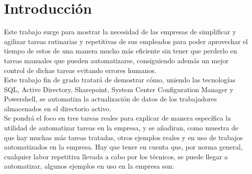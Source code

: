 \documentclass[a4paper, 12pt]{book}
\begin{document}
\tableofcontents 
\cleardoublepage
\listoffigures %



\cleardoublepage
\chapter{Introducción}
\label{sec:intro} %

Este trabajo surge para mostrar la necesidad de las empresas de simplificar y agilizar tareas rutinarias y repetitivas de sus empleados para poder aprovechar el tiempo de estos de una manera mucho más eficiente sin tener que perderlo en tareas manuales que pueden automatizarse, consiguiendo además un mejor control de dichas tareas evitando errores humanos.
\\

Este trabajo fin de grado tratará de demostrar cómo, uniendo las tecnologías SQL, Active Directory, Sharepoint, System Center Configuration Manager y Powershell, se automatiza la actualización de datos de los trabajadores almacenados en el directorio activo.
\\

Se pondrá el foco en tres tareas reales para explicar de manera específica la utilidad de automatizar tareas en la empresa, y se añadiran, como muestra de que hay muchas más tareas tratadas, otros ejemplos reales y en uso de trabajos automatizados en la empresa. Hay que tener en cuenta que, por norma general, cualquier labor repetitiva llevada a cabo por los técnicos, se puede llegar a automatizar, algunos ejemplos en uso en la empresa son:
\end{document}
